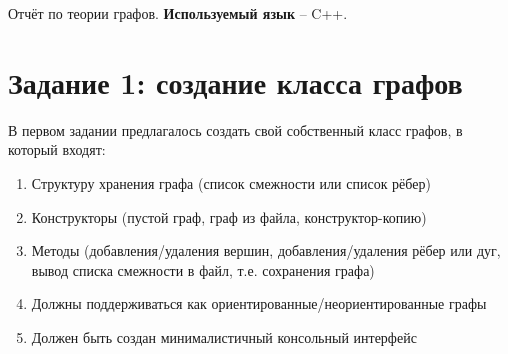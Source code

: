 \documentclass[otchet]{SCWorks}
\begin{document}

\date{2023}

\maketitle


\tableofcontents




\intro

Отчёт по теории графов. \textbf{Используемый язык} -- C++.

\section{Задание 1: создание класса графов}

В первом задании предлагалось создать свой собственный класс графов, в который входят:

\begin{enumerate}
\item Структуру хранения графа (список смежности или список рёбер)
\item Конструкторы (пустой граф, граф из файла, конструктор-копию)
\item Методы (добавления/удаления вершин, добавления/удаления рёбер или дуг, вывод списка смежности в файл, т.е. сохранения графа)
\item Должны поддерживаться как ориентированные/неориентированные графы
\item Должен быть создан минималистичный консольный интерфейс
\end{enumerate}
\end{document}
